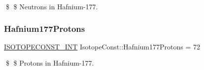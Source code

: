 \$ \$ Neutrons in Hafnium-\/177. \mbox{\label{group___isotope_const-_hafnium-_hf177_ga07189e81939b8a0b9565be9452629f35}} 
\subsubsection{\texorpdfstring{Hafnium177\+Protons}{Hafnium177Protons}}
{\footnotesize\ttfamily \mbox{\hyperlink{group___isotope_const-_macros_ga5f18360b3e99483a35c32d789e62621c}{I\+S\+O\+T\+O\+P\+E\+C\+O\+N\+S\+T\+\_\+\+I\+NT}} Isotope\+Const\+::\+Hafnium177\+Protons = 72}

\$ \$ Protons in Hafnium-\/177. 
